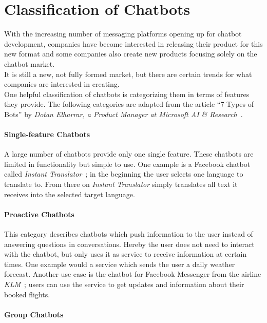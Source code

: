 \section{Classification of Chatbots}
\label{classification}


With the increasing number of messaging platforms opening up for chatbot development,
companies have become interested in releasing their product for this new format and some companies also create new products focusing solely on the chatbot market.
\\

It is still a new, not fully formed market, but there are certain trends for what companies are interested in creating.
\\

One helpful classification of chatbots is categorizing them in terms of features they provide.
The following categories are adapted from the article ``7 Types of Bots'' by \emph{Dotan Elharrar, a Product Manager at Microsoft AI \& Research}~\cite{bottypes}.


\paragraph{Single-feature Chatbots}

A large number of chatbots provide only one single feature.
These chatbots are limited in functionality but simple to use.
One example is a Facebook chatbot called \emph{Instant Translator}~\cite{instanttranslator};
in the beginning the user selects one language to translate to. From there on \emph{Instant Translator} simply translates all text it receives into the selected target language.


\paragraph{Proactive Chatbots}

This category describes chatbots which push information to the user instead of answering questions in conversations.
Hereby the user does not need to interact with the chatbot, but only uses it as service to receive information at certain times.
One example would a service which sends the user a daily weather forecast.
Another use case is the chatbot for Facebook Messenger from the airline \emph{KLM}~\cite{klm}; users can use the service to get updates and information about their booked flights.


\paragraph{Group Chatbots}

